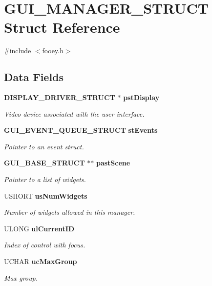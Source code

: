 \section{GUI\_\-MANAGER\_\-STRUCT Struct Reference}
\label{struct_g_u_i___m_a_n_a_g_e_r___s_t_r_u_c_t}


{\ttfamily \#include $<$fooey.h$>$}\subsection*{Data Fields}
\begin{DoxyCompactItemize}
\item 
{\bf DISPLAY\_\-DRIVER\_\-STRUCT} $\ast$ {\bf pstDisplay}
\begin{DoxyCompactList}\small\item\em Video device associated with the user interface. \item\end{DoxyCompactList}\item 
{\bf GUI\_\-EVENT\_\-QUEUE\_\-STRUCT} {\bf stEvents}
\begin{DoxyCompactList}\small\item\em Pointer to an event struct. \item\end{DoxyCompactList}\item 
{\bf GUI\_\-BASE\_\-STRUCT} $\ast$$\ast$ {\bf pastScene}
\begin{DoxyCompactList}\small\item\em Pointer to a list of widgets. \item\end{DoxyCompactList}\item 
USHORT {\bf usNumWidgets}
\begin{DoxyCompactList}\small\item\em Number of widgets allowed in this manager. \item\end{DoxyCompactList}\item 
ULONG {\bf ulCurrentID}
\begin{DoxyCompactList}\small\item\em Index of control with focus. \item\end{DoxyCompactList}\item 
UCHAR {\bf ucMaxGroup}
\begin{DoxyCompactList}\small\item\em Max group. \item\end{DoxyCompactList}\end{DoxyCompactItemize}


